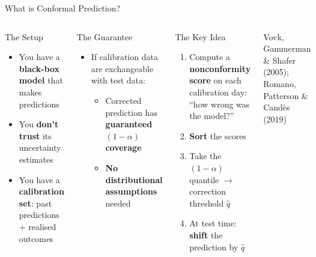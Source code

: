\documentclass[9pt, aspectratio=169, t]{beamer}
\begin{document}
\begin{frame}{What is Conformal Prediction?}
	\begin{columns}[T]
		\begin{block}{The Setup}
		\begin{itemize}\setlength{\itemsep}{3pt}
			\item You have a \textbf{black-box model} that makes predictions
			\item You \textbf{don't trust} its uncertainty estimates
			\item You have a \textbf{calibration set}: past predictions + realised outcomes
		\end{itemize}
		\end{block}

		\begin{alertblock}{The Guarantee}
		\begin{itemize}\setlength{\itemsep}{2pt}
			\item If calibration data are exchangeable with test data:
			\begin{itemize}
				\item Corrected prediction has \textbf{guaranteed $(1-\alpha)$ coverage}
				\item \textbf{No distributional assumptions} needed
			\end{itemize}
		\end{itemize}
		\end{alertblock}

		\begin{exampleblock}{The Key Idea}
		\begin{enumerate}\setlength{\itemsep}{3pt}
			\item Compute a \textbf{nonconformity score} on each calibration day: ``how wrong was the model?''
			\item \textbf{Sort} the scores
			\item Take the $(1-\alpha)$ quantile $\to$ correction threshold $\hat{q}$
			\item At test time: \textbf{shift} the prediction by $\hat{q}$
		\end{enumerate}
		\end{exampleblock}

		{\scriptsize Vovk, Gammerman \& Shafer (2005); Romano, Patterson \& Cand\`es (2019)}
	\end{columns}
\end{frame}
\end{document}
